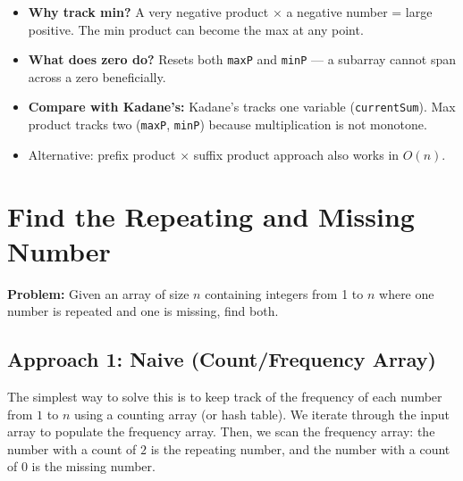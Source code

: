 \documentclass[12pt,a4paper,oneside]{book}
\begin{document}
\begin{interviewcorner}
\begin{itemize}
  \item \textbf{Why track min?} A very negative product $\times$ a negative number = large positive. The min product can become the max at any point.
  \item \textbf{What does zero do?} Resets both \texttt{maxP} and \texttt{minP} --- a subarray cannot span across a zero beneficially.
  \item \textbf{Compare with Kadane's:} Kadane's tracks one variable (\texttt{currentSum}). Max product tracks two (\texttt{maxP}, \texttt{minP}) because multiplication is not monotone.
  \item Alternative: prefix product $\times$ suffix product approach also works in $O(n)$.
\end{itemize}
\end{interviewcorner}

\section{Find the Repeating and Missing Number}

\textbf{Problem:} Given an array of size $n$ containing integers from 1 to $n$ where one number is repeated and one is missing, find both.

\subsection{Approach 1: Naive (Count/Frequency Array)}
The simplest way to solve this is to keep track of the frequency of each number from $1$ to $n$ using a counting array (or hash table). We iterate through the input array to populate the frequency array. Then, we scan the frequency array: the number with a count of $2$ is the repeating number, and the number with a count of $0$ is the missing number.
\end{document}
